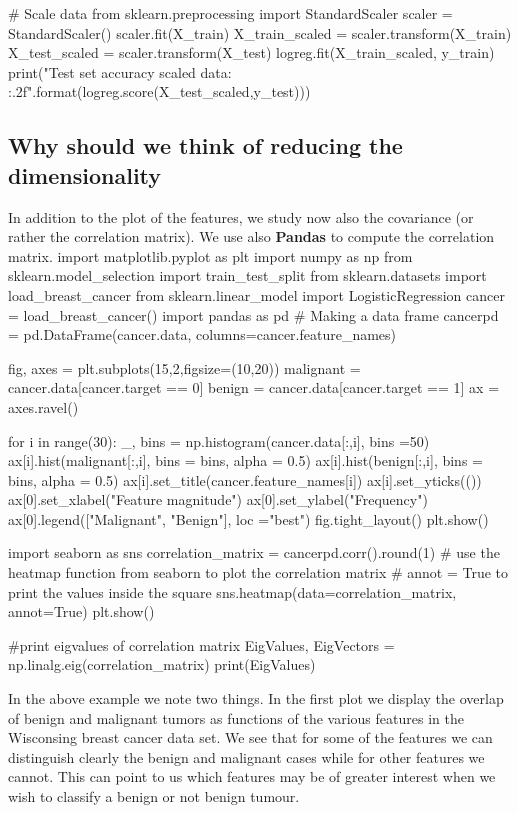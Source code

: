 \documentclass[%
oneside,                 %
final,                   %
10pt]{article}
\begin{document}
# Scale data
from sklearn.preprocessing import StandardScaler
scaler = StandardScaler()
scaler.fit(X_train)
X_train_scaled = scaler.transform(X_train)
X_test_scaled = scaler.transform(X_test)
logreg.fit(X_train_scaled, y_train)
print("Test set accuracy scaled data: {:.2f}".format(logreg.score(X_test_scaled,y_test)))

\epycod




\subsection{Why should we think of reducing the dimensionality}

In addition to the plot of the features, we study now also the covariance (or rather the correlation matrix).
We use also \textbf{Pandas} to compute the correlation matrix.
\bpycod
import matplotlib.pyplot as plt
import numpy as np
from sklearn.model_selection import  train_test_split 
from sklearn.datasets import load_breast_cancer
from sklearn.linear_model import LogisticRegression
cancer = load_breast_cancer()
import pandas as pd
# Making a data frame
cancerpd = pd.DataFrame(cancer.data, columns=cancer.feature_names)

fig, axes = plt.subplots(15,2,figsize=(10,20))
malignant = cancer.data[cancer.target == 0]
benign = cancer.data[cancer.target == 1]
ax = axes.ravel()

for i in range(30):
    _, bins = np.histogram(cancer.data[:,i], bins =50)
    ax[i].hist(malignant[:,i], bins = bins, alpha = 0.5)
    ax[i].hist(benign[:,i], bins = bins, alpha = 0.5)
    ax[i].set_title(cancer.feature_names[i])
    ax[i].set_yticks(())
ax[0].set_xlabel("Feature magnitude")
ax[0].set_ylabel("Frequency")
ax[0].legend(["Malignant", "Benign"], loc ="best")
fig.tight_layout()
plt.show()

import seaborn as sns
correlation_matrix = cancerpd.corr().round(1)
# use the heatmap function from seaborn to plot the correlation matrix
# annot = True to print the values inside the square
sns.heatmap(data=correlation_matrix, annot=True)
plt.show()

#print eigvalues of correlation matrix
EigValues, EigVectors = np.linalg.eig(correlation_matrix)
print(EigValues)
\epycod

In the above example we note two things. In the first plot we display
the overlap of benign and malignant tumors as functions of the various
features in the Wisconsing breast cancer data set. We see that for
some of the features we can distinguish clearly the benign and
malignant cases while for other features we cannot. This can point to
us which features may be of greater interest when we wish to classify
a benign or not benign tumour.
\end{document}

